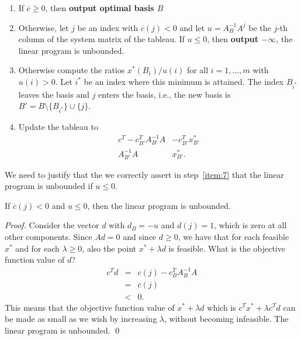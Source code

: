 \begin{enumerate}
\item If $\overline{c}\geq0$, then {\bf output optimal basis $B$}
  \label{item:3}
\item Otherwise, let $j$ be an index with $\overline{c}(j)<0$ and let
  $u = A_B^{-1}A^j$ be the $j$-th column of the system matrix of the
  tableau. If $u\leq0$, then {\bf output $-\infty$}, the linear program is
  unbounded. \label{item:7}
\item Otherwise compute the ratios $x^*(B_i)/ u(i)$ for all $i =
  1,\ldots,m$ with $u(i)>0$. Let $i^*$ be an index where this minimum is
  attained. The index $B_{i^*}$ leaves the basis and $j$ enters the
  basis, i.e., the new basis is $B' = B \setminus\{B_{i^*}\} \cup \{j\}$. 
\item Update the tableau to 
  \begin{displaymath}    
  \begin{array}{c|c}
    c^T - c_{B'}^TA_{B'}^{-1}A  & -c_{B'}^Tx^*_{B'} \\ \hline 
    A_{B'}^{-1}A        & x^*_{B'}.
  \end{array}
\end{displaymath}
\end{enumerate}
%
We need to justify that the we correctly assert in step~\ref{item:7} that the linear
program is unbounded if $u\leq0$. 
\begin{theorem}
  \label{thr:1}
  If $\overline{c}(j)<0$  and $u\leq0$, then the linear program is
  unbounded. 
\end{theorem}

\begin{proof}
  Consider the vector $d$ with $d_B = -u$ and $d(j) = 1$, which is
  zero at all other components. Since $A d=0$ and since $d\geq0$, we
  have that for each feasible $x^*$ and for each $\lambda\geq0$, also the
  point $x^* + \lambda d$ is feasible. What is the objective function value
  of $d$? 
  \begin{eqnarray*}
    c^Td & = & c(j) - c_B^T A_B^{-1} A \\
        & = & \overline{c}(j) \\
        & < & 0. 
  \end{eqnarray*}
  This means that  the objective function value of $x^* +
  \lambda d$ which is $c^Tx^* + \lambda c^Td$ can be made as small as we wish by
  increasing $\lambda$, without becoming infeasible.  The linear program is
  unbounded. 
  \qed 
\end{proof}




